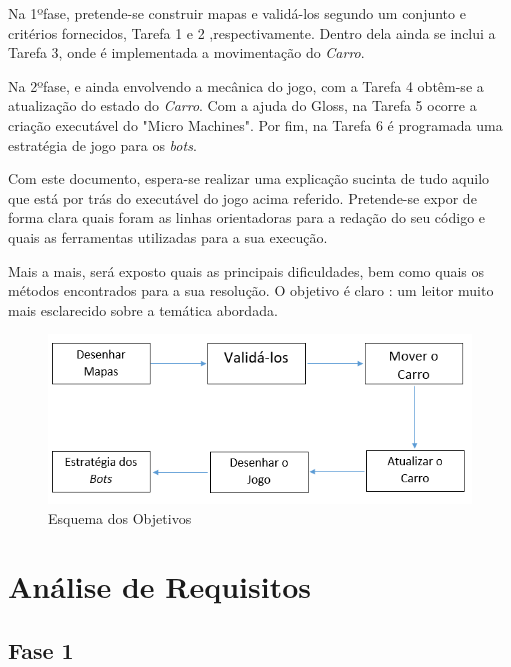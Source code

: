\documentclass[a4paper]{report} %
\begin{document}
    Na 1ºfase, pretende-se construir mapas e validá-los segundo um conjunto e critérios fornecidos, Tarefa 1 e 2 ,respectivamente. Dentro dela ainda se inclui a Tarefa 3, onde é implementada a movimentação do \emph{Carro}. 
    
    Na 2ºfase, e ainda envolvendo a mecânica do jogo, com a Tarefa 4 obtêm-se a atualização do estado do \emph{Carro}. Com a ajuda do Gloss, na Tarefa 5 ocorre a criação executável do "Micro Machines". Por fim, na Tarefa 6 é programada uma estratégia de jogo para os \textit{bots}.
    
    Com este documento, espera-se realizar uma explicação sucinta de tudo aquilo que está por trás do executável do jogo acima referido. Pretende-se expor de forma clara quais foram as linhas orientadoras para a redação do seu código e quais as ferramentas utilizadas para a sua execução.
    
    Mais a mais, será exposto quais as principais dificuldades, bem como quais os métodos encontrados para a sua resolução.
    O objetivo é claro : um leitor muito mais esclarecido sobre a temática abordada.
    
    
   \begin{figure}[h!]
        
        \centering
        \includegraphics[scale = 0.7]{Imagens/graficoR.png}
        \caption{Esquema dos Objetivos}
   
   \end{figure}


\chapter{Análise de Requisitos}

\section{Fase 1}
\label{sec:analisefase1}
\end{document}
